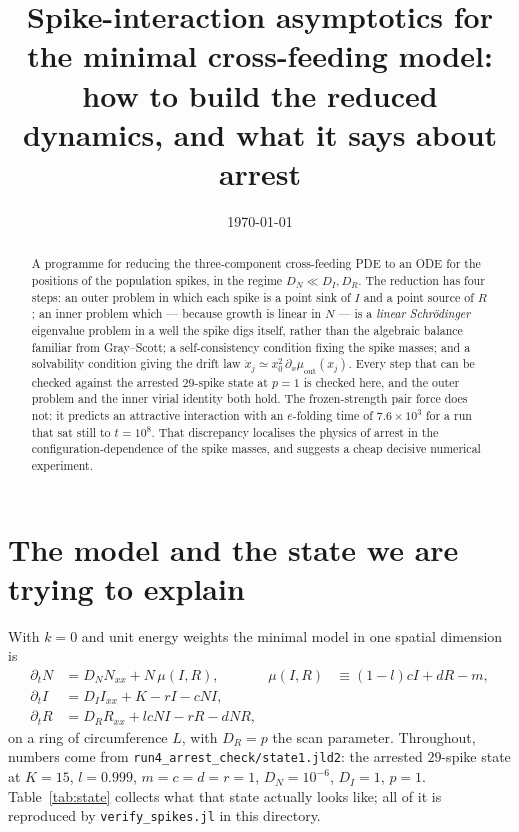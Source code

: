 \documentclass[11pt,a4paper]{article}
\title{Spike-interaction asymptotics for the minimal cross-feeding model:\\
how to build the reduced dynamics, and what it says about arrest}
\author{}
\date{\today}
\newcommand{\xj}{x_j}
\newcommand{\muout}{\mu_{\mathrm{out}}}
\theoremstyle{plain}
\theoremstyle{remark}
\begin{document}
\maketitle

\begin{abstract}
\noindent
A programme for reducing the three-component cross-feeding PDE to an ODE for
the positions of the population spikes, in the regime $D_N \ll D_I, D_R$. The
reduction has four steps: an outer problem in which each spike is a point sink
of $I$ and a point source of $R$; an inner problem which --- because growth is
linear in $N$ --- is a \emph{linear Schr\"odinger} eigenvalue problem in a well
the spike digs itself, rather than the algebraic balance familiar from
Gray--Scott; a self-consistency condition fixing the spike masses; and a
solvability condition giving the drift law $\dot \xj \simeq x_0^2\,
\partial_x\muout(\xj)$. Every step that can be checked against the arrested
$29$-spike state at $p=1$ is checked here, and the outer problem and the
inner virial identity both hold. The frozen-strength pair force does not: it
predicts an attractive interaction with an $e$-folding time of $7.6\times10^3$
for a run that sat still to $t=10^8$. That discrepancy localises the physics of
arrest in the configuration-dependence of the spike masses, and suggests a
cheap decisive numerical experiment.
\end{abstract}

\section{The model and the state we are trying to explain}

With $k=0$ and unit energy weights the minimal model in one spatial dimension is
\begin{align}
\partial_t N &= D_N N_{xx} + N\,\mu(I,R), &
\mu(I,R) &\equiv (1-l)cI + dR - m, \label{eq:N}\\
\partial_t I &= D_I I_{xx} + K - rI - cNI, \label{eq:I}\\
\partial_t R &= D_R R_{xx} + lcNI - rR - dNR, \label{eq:R}
\end{align}
on a ring of circumference $L$, with $D_R = p$ the scan parameter. Throughout,
numbers come from \texttt{run4\_arrest\_check/state1.jld2}: the arrested
$29$-spike state at $K=15$, $l=0.999$, $m=c=d=r=1$, $D_N=10^{-6}$, $D_I=1$,
$p=1$. Table~\ref{tab:state} collects what that state actually looks like; all
of it is reproduced by \texttt{verify\_spikes.jl} in this directory.
\end{document}
